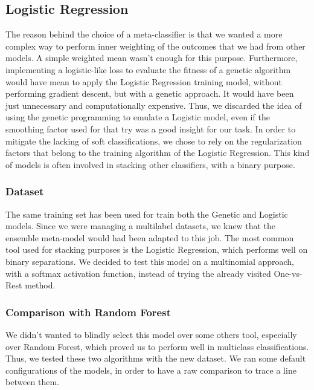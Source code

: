 \subsection{Logistic Regression}
The reason behind the choice of a meta-classifier is that we wanted a more complex way to perform inner weighting of the outcomes that we had from other models.
A simple weighted mean wasn't enough for this purpose. Furthermore, implementing a logistic-like loss to evaluate the fitness of a genetic algorithm would have mean to apply the Logistic Regression training model, without performing gradient descent, but with a genetic approach. It would have been just unnecessary and computationally expensive.
Thus, we discarded the idea of using the genetic programming to emulate a Logistic model, even if the smoothing factor used for that try was a good insight for our task.
In order to mitigate the lacking of soft classifications, we chose to rely on the regularization factors that belong to the training algorithm of the Logistic Regression.
This kind of models is often involved in stacking other classifiers, with a binary purpose.

\subsubsection{Dataset}
The same training set has been used for train both the Genetic and Logistic models.
Since we were managing a multilabel datasets, we knew that the ensemble meta-model would had been adapted to this job. The most common tool used for stacking purposes is the Logistic Regression, which performs well on binary separations. We decided to test this model on a multinomial approach, with a softmax activation function, instead of trying the already visited One-vs-Rest method.

\subsubsection{Comparison with Random Forest}
We didn't wanted to blindly select this model over some others tool, especially over Random Forest, which proved us to perform well in multiclass classifications.
Thus, we tested these two algorithms with the new dataset.
We ran some default configurations of the models, in order to have a raw comparison to trace a line between them.


